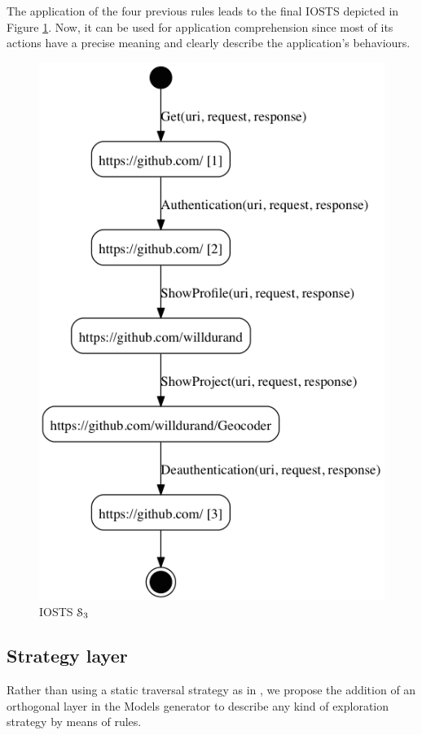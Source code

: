 \begin{example}
The application of the four previous rules leads to the final
IOSTS depicted in Figure \ref{fig:github:iosts:4}. Now, it can be
used for application comprehension since most of its actions have
a precise meaning and clearly describe the application's
behaviours.
\end{example}

\begin{figure}[ht]
    \begin{center}
    \includegraphics[width=0.6\linewidth]{figures/gh-iosts-41.png}
    \caption {IOSTS $\EuScript{S}_3$}
    \label{fig:github:iosts:4}
    \end{center}
\end{figure}

\subsection{Strategy layer}
\label{sec:modelinf:webapps:strategy}

Rather than using a static traversal strategy as in
\cite{Memon:2003,concolicandroid12,crawljax:tweb12,
Amalfitano:2012:UGR:2351676.2351717, WPX13}, we propose the
addition of an orthogonal layer in the Models generator to
describe any kind of exploration strategy by means of rules.

